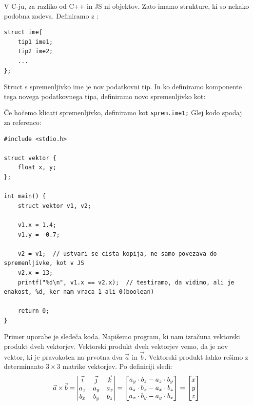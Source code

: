 \documentclass[a4paper, 12pt]{article}
\begin{document}
V C-ju, za razliko od C++ in JS ni objektov. Zato imamo strukture, ki so nekako podobna zadeva. Definiramo z :
\begin{lstlisting}
struct ime{
	tip1 ime1;
	tip2 ime2;
	...
};
\end{lstlisting}
Struct s spremenljivko ime je nov podatkovni tip. In ko definiramo komponente tega novega podatkovnega tipa, definiramo novo spremenljivko kot:

Če hočemo klicati spremenljivko, definiramo kot \lstinline|sprem.ime1;| Glej kodo spodaj za referenco:

\begin{lstlisting}
#include <stdio.h>

struct vektor {
	float x, y;		
};

int main() {
	struct vektor v1, v2;

	v1.x = 1.4;	
	v1.y = -0.7;

	v2 = v1;  // ustvari se cista kopija, ne samo povezava do spremenljivke, kot v JS
	v2.x = 13;
	printf("%d\n", v1.x == v2.x);  // testiramo, da vidimo, ali je enakost, %d, ker nam vraca 1 ali 0(boolean)
	
	return 0;
}
\end{lstlisting}

Primer uporabe  je sledeča koda. Napišemo program, ki nam izračuna vektorski produkt dveh vektorjev. Vektorski produkt dveh vektorjev vemo, da je nov vektor, ki je pravokoten na prvotna dva $\vec{a}$ in $\vec{b}$. Vektorski produkt lahko rešimo z determinanto $3 \times 3$ matrike vektorjev. Po definiciji sledi:
\begin{equation*}
\vec{a} \times \vec{b} = 
\begin{vmatrix}
\vec{i} & \vec{j} & \vec{k} \\
a_x & a_y & a_z\\ 
b_x & b_y &b_z \notag
\end{vmatrix} = 
\begin{bmatrix}
a_y\cdot b_z - a_z\cdot b_y \\
a_z\cdot b_x - a_x\cdot b_z \\
a_x\cdot b_y - a_y\cdot b_x
\end{bmatrix} = 
\begin{bmatrix}
x \\ 
y \\ 
z
\end{bmatrix}
\end{equation*}
\end{document}
